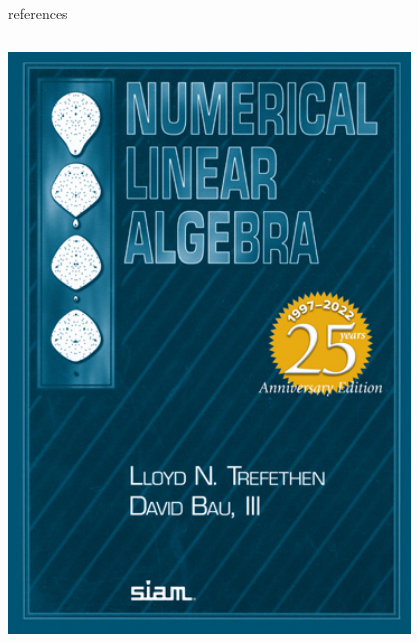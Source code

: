 \documentclass[10pt,
               svgnames,
               hyperref={colorlinks,citecolor=DeepPink4,linkcolor=FireBrick,urlcolor=Maroon},
               usepdftitle=false]{beamer}
\begin{document}
\begin{frame}{references}
\begin{columns}
\begin{column}{0.15\textwidth}
\bigskip
\hfill \includegraphics[width=0.8\textwidth]{images/trefethenbau.jpg}

\vspace{5mm}
\end{column}
\end{columns}
\end{frame}
\end{document}
